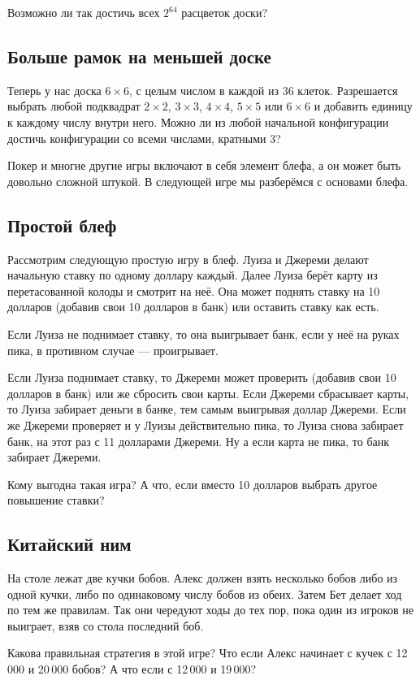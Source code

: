 Возможно ли так достичь всех $2^{64}$ расцветок доски?

\subsection*{Больше рамок на меньшей доске}

Теперь у нас доска $6 \times 6$, с целым числом в каждой из $36$ клеток.
Разрешается выбрать любой подквадрат $2 \times 2$, $3 \times 3$, $4 \times 4$, $5 \times 5$ или $6 \times 6$ и добавить единицу к каждому числу внутри него.
Можно ли из любой начальной конфигурации достичь конфигурации со всеми числами, кратными $3$?


\medskip

Покер и многие другие игры включают в себя элемент блефа, а он может быть довольно сложной штукой.
В следующей игре мы разберёмся с основами блефа.

\subsection*{Простой блеф}

Рассмотрим следующую простую игру в блеф.
Луиза и Джереми делают начальную ставку по одному доллару каждый.
Далее Луиза берёт карту из перетасованной колоды и смотрит на неё.
Она может поднять ставку на 10 долларов (добавив свои 10 долларов в банк) или оставить ставку как есть.

Если Луиза не поднимает ставку, то она выигрывает банк, если у неё на руках пика, в противном случае --- проигрывает.

Если Луиза поднимает ставку, то Джереми может проверить (добавив свои 10 долларов в банк) или же сбросить свои карты.
Если Джереми сбрасывает карты, то Луиза забирает деньги в банке, тем самым выигрывая доллар Джереми.
Если же Джереми проверяет и у Луизы действительно пика, то Луиза снова забирает банк, на этот раз с 11 долларами Джереми.
Ну а если карта не пика, то банк забирает Джереми.

Кому выгодна такая игра?
А что, если вместо 10 долларов выбрать другое повышение ставки?

\subsection*{Китайский ним}

На столе лежат две кучки бобов.
Алекс должен взять несколько бобов либо из одной кучки, либо по одинаковому числу бобов из обеих.
Затем Бет делает ход по тем же правилам.
Так они чередуют ходы до тех пор, пока один из игроков не выиграет, взяв со стола последний боб.

Какова правильная стратегия в этой игре?
Что если Алекс начинает с кучек с 12\,000 и 20\,000 бобов?
А что если с 12\,000 и 19\,000?

